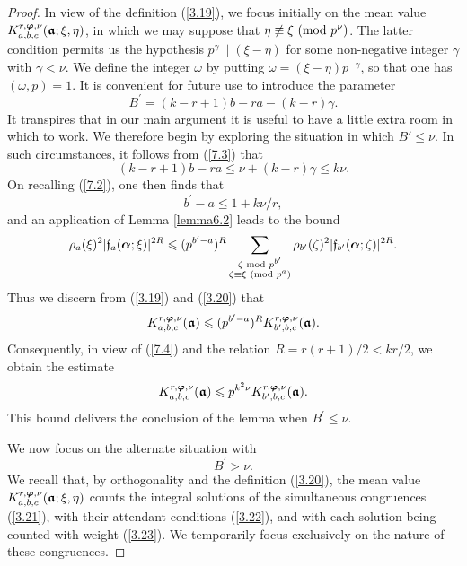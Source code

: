 \documentclass[12pt,reqno]{amsart}
\theoremstyle{definition}
\theoremstyle{remark}
\numberwithin{equation}{section}
\newcommand{\mmod}[1]{\,\,(\text{\rm mod}\,\,#1)}
\newcommand{\nmod}[1]{\,\,\text{\rm mod}\,\,#1}
\def\grf{{\mathfrak f}}\def\grF{{\mathfrak F}}
\def\gam{{\gamma}} \def\Gam{{\Gamma}}
\def\zet{{\zeta}} \def\bfzet{{\boldsymbol \zeta}} \def\zetbar{{\overline \zet}}
\def\ome{{\omega}} \def\Ome{{\Omega}}
\def\le{\leqslant} \def\ge{\geqslant} \def\pleq{\preccurlyeq} \def\ple{\prec}
\begin{document}
\begin{proof} In view of the definition (\ref{3.19}), we focus initially on the mean value 
$K_{a,b,c}^{r,{\boldsymbol \varphi},\nu}({\boldsymbol {{\mathfrak a}}};\xi,\eta)$, in which we may suppose that 
$\eta\not\equiv \xi\mmod{p^\nu}$. The latter condition permits us the hypothesis 
$p^\gam \| (\xi-\eta)$ for some non-negative integer $\gam$ with $\gam<\nu$. We define 
the integer $\ome$ by putting $\ome=(\xi-\eta)p^{-\gam}$, so that one has 
$(\ome ,p)=1$. It is convenient for future use to introduce the parameter
\begin{equation}\label{7.3}
B^\prime=(k-r+1)b-ra-(k-r)\gam.
\end{equation}
It transpires that in our main argument it is useful to have a little extra room in which to 
work. We therefore begin by exploring the situation in which $B'\le \nu$. In such 
circumstances, it follows from (\ref{7.3}) that
$$(k-r+1)b-ra\le \nu +(k-r)\gam\le k\nu.$$
On recalling (\ref{7.2}), one then finds that
\begin{equation}\label{7.4}
b^\prime -a\le 1+k\nu/r,
\end{equation}
and an application of Lemma \ref{lemma6.2} leads to the bound
$$\rho_a(\xi)^2|\grf_a(\bfalp;\xi)|^{2R}\le (p^{b^\prime -a})^R
\sum_{\substack{\zet\nmod{p^{b^\prime}}\\ \zet\equiv \xi\mmod{p^a}}}
\rho_{b^\prime}(\zet)^2|\grf_{b^\prime}(\bfalp;\zet)|^{2R}.$$
Thus we discern from (\ref{3.19}) and (\ref{3.20}) that
$$K_{a,b,c}^{r,\bfvarphi,\nu}(\bfgra)\le (p^{b^\prime-a})^R
K_{b^\prime,b,c}^{r,\bfvarphi,\nu}(\bfgra).$$
Consequently, in view of (\ref{7.4}) and the relation $R=r(r+1)/2<kr/2$, we obtain the 
estimate
$$K_{a,b,c}^{r,\bfvarphi,\nu}(\bfgra)\le p^{k^2\nu}
K_{b^\prime,b,c}^{r,\bfvarphi,\nu}(\bfgra).$$
This bound delivers the conclusion of the lemma when $B^\prime \le \nu$.\par

We now focus on the alternate situation with
\begin{equation}\label{7.5}
B^\prime >\nu.
\end{equation}
We recall that, by orthogonality and the definition (\ref{3.20}), the mean value 
$K_{a,b,c}^{r,{\boldsymbol \varphi},\nu}({\boldsymbol {{\mathfrak a}}};\xi,\eta)$ counts the integral solutions of the 
simultaneous congruences (\ref{3.21}), with their attendant conditions (\ref{3.22}), and with 
each solution being counted with weight (\ref{3.23}). We temporarily focus exclusively on 
the nature of these congruences.\par


\end{proof}
\end{document}
